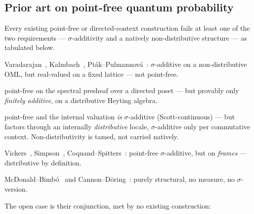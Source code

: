 \documentclass[11pt,reqno]{amsart}
\theoremstyle{plain}
\theoremstyle{definition}
\theoremstyle{remark}
\begin{document}
\subsection{Prior art on point-free quantum probability}
\label{sec:priorart}
Every existing point-free or directed-context construction fails at least one
of the two requirements --- $\sigma$-additivity and a natively
non-distributive structure --- as tabulated below.
\begin{description}[style=nextline, font=\normalfont\bfseries,
    labelwidth=3.2cm, leftmargin=3.6cm]
  \item[Gleason tradition]
    Varadarajan~\cite{Varadarajan1985}, Kalmbach~\cite{Kalmbach1983},
    Pt\'{a}k--Pulmannov\'{a}~\cite{PtakPulmannova1994}: $\sigma$-additive on
    a non-distributive OML, but real-valued on a fixed lattice --- not
    point-free.
  \item[D\"{o}ring 2009]
    \cite{Doering2009measures} point-free on the spectral presheaf over a
    directed poset --- but provably only \emph{finitely additive}, on a
    distributive Heyting algebra.
  \item[Bohrification (HLS)]
    \cite{HeunenLandsmanSpitters2009, HeunenLandsmanSpitters2011}
    point-free and the internal valuation \emph{is} $\sigma$-additive
    (Scott-continuous) --- but factors through an internally
    \emph{distributive} locale, $\sigma$-additive only per commutative
    context. Non-distributivity is tamed, not carried natively.
  \item[Localic valuations]
    Vickers~\cite{Vickers2008}, Simpson~\cite{Simpson2012},
    Coquand--Spitters~\cite{CoquandSpitters2009}: point-free
    $\sigma$-additive, but on \emph{frames} --- distributive by definition.
  \item[OML Stone dualities]
    McDonald--Bimb\'{o}~\cite{McDonaldBimbo2023} and
    Cannon--D\"{o}ring~\cite{Cannon2013}: purely structural, no measure,
    no $\sigma$-version.
\end{description}
The open case is their conjunction, met by no existing construction:
\begin{center}
\end{center}
\end{document}
